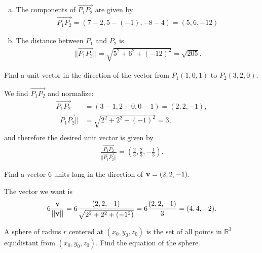 \documentclass[12pt,letterpaper,reqno]{article}
\numberwithin{equation}{section}
\begin{document}
{\color{red}  
\begin{enumerate}[(a)]
	\item The components of $\overrightarrow{P_1P_2}$ are given by
	\begin{align*}
		\overrightarrow{P_1P_2}=(7-2,5-(-1),-8-4)=(5,6,-12)
	\end{align*}
	\item The distance between $P_1$ and $P_2$ is 
	\begin{align*}
		||\overrightarrow{P_1P_2}||=\sqrt{5^2+6^2+(-12)^2}=\sqrt{205}.
	\end{align*}
\end{enumerate}}

\begin{exercise}
Find a unit vector in the direction of the vector from $P_1(1,0,1)$ to $P_2(3,2,0)$.
\end{exercise}

{\color{red} 
We find $\overrightarrow{P_1P_2}$ and normalize:
\begin{align*}
	\overrightarrow{P_1P_2}&=(3-1,2-0,0-1)=(2,2,-1), \\
	||\overrightarrow{P_1P_2}||&=\sqrt{2^2+2^2+(-1)^2}=3, \\
\end{align*}
and therefore the desired unit vector is given by
\begin{align*}
	\frac{\overrightarrow{P_1P_2}}{||\overrightarrow{P_1P_2}||}=(\frac{2}{3},\frac{2}{3},-\frac{1}{3}).
\end{align*}}

\begin{exercise}
Find a vector 6 units long in the direction of ${\bf v}=(2,2,-1)$.	
\end{exercise}

{\color{red} 
The vector we want is 
\begin{align*}
6\frac{{\bf v}}{||{\bf v}||}=6\frac{(2,2,-1)}{\sqrt{2^2+2^2+(-1^2)}}=6\frac{(2,2,-1)}{3}=(4,4,-2).	
\end{align*}
}

\begin{exercise}
	A sphere of radius $r$ centered at $(x_0,y_0,z_0)$ is the set of all points in $\mathbb{R}^3$ equidistant from $(x_0,y_0,z_0)$. Find the equation of the sphere.
\end{exercise}
\end{document}
